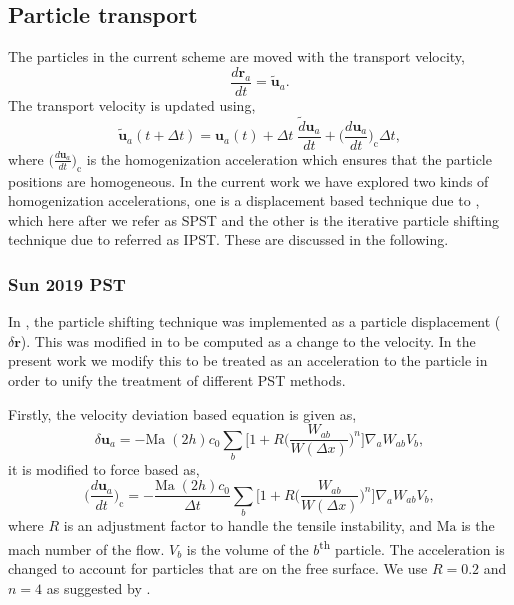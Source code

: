 \documentclass[preprint,12pt]{elsarticle}
\newcommand{\ten}[1]{\ensuremath{\mathbf{#1}}}
\begin{document}
\subsection{Particle transport}

The particles in the current scheme are moved with the transport velocity,
\begin{equation}
  \label{eq:transport_velocity_position_derivative}
  \frac{d\ten{r}_a}{dt} = \ten{\tilde{u}}_a.
\end{equation}
%
The transport velocity is updated using,
\begin{equation}
  \label{eq:transport_velocity}
  \ten{\tilde{u}}_a(t + \Delta t) =\ten{u}_a(t) + \Delta t \; \frac{\tilde{d} \ten{u}_a}{dt} +
  \bigg(\frac{d \ten{u}_{a}}{dt}\bigg)_{\text{c}} \Delta t,
\end{equation}
%
where $\big(\frac{d \ten{u}_a}{dt}\big)_{\text{c}}$ is the homogenization
acceleration which ensures that the particle positions are homogeneous. In the
current work we have explored two kinds of homogenization accelerations, one
is a displacement based technique due to \citet{sun2017deltaplus}, which here
after we refer as SPST and the other is the iterative particle shifting
technique due to \citet{huang_kernel_2019} referred as IPST. These are
discussed in the following.


\subsubsection{Sun 2019 PST}
\label{sec:sunpst}

In \citet{sun2017deltaplus}, the particle shifting technique was implemented as
a particle displacement ($\delta \ten{r}$). This was modified in
\citet{sun_consistent_2019} to be computed as a change to the velocity. In the
present work we modify this to be treated as an acceleration to the particle
in order to unify the treatment of different PST methods.

Firstly, the velocity deviation based equation is given as,
\begin{equation}
  \label{eq:sun2019_pst}
  \delta \ten{u}_a = - \text{Ma} \; (2h) c_0 \sum_b \bigg[
  1 + R \bigg( \frac{W_{ab}}{W(\Delta x)} \bigg)^n  \bigg] \nabla_a W_{ab} V_b,
\end{equation}
%
it is modified to force based as,
\begin{equation}
  \label{eq:sun2019_pst}
  \bigg(\frac{d \ten{u}_a}{dt}\bigg)_{\text{c}} = - \frac{\text{Ma} \;
    (2h) c_0}{\Delta t} \sum_b \bigg[1 + R \bigg( \frac{W_{ab}}{W(\Delta x)} \bigg)^n
  \bigg] \nabla_a W_{ab} V_b,
\end{equation}
where $R$ is an adjustment factor to handle the tensile instability, and
$\text{Ma}$ is the mach number of the flow. $V_b$ is the volume of the
$b$\textsuperscript{th} particle. The acceleration is changed to account for
particles that are on the free surface. We use $R = 0.2$ and $n = 4$ as
suggested by \citet{sun_consistent_2019}.
\end{document}

